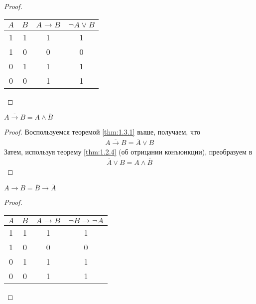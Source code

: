 \begin{proof}
	\hfill \break \break
	\begin{center}
		\begin{tabular}{ |c|c|c|c| } 
			\hline
			$A$ & $B$ & $A \rightarrow B$ & $\neg A \lor B$ \\
			\hline 
			1 & 1 & 1 & 1 \\ 
			1 & 0 & 0 & 0 \\
			0 & 1 & 1 & 1 \\ 
			0 & 0 & 1 & 1 \\  
			\hline
		\end{tabular}
	\end{center}
\end{proof}

\begin{theorem}
	$\overline{A \rightarrow B} = A \land \overline{B}$
\end{theorem}

\begin{proof}
	Воспользуемся теоремой \ref{thm:1.3.1} выше, получаем, что
	\begin{align*}
		\overline{A \rightarrow B} = \overline{A} \lor B 
	\end{align*}
	Затем, используя теорему \ref{thm:1.2.4} (об отрицании конъюнкции), преобразуем в
	\begin{align*}
		\overline{A} \lor B = A \land \overline{B}
	\end{align*} 
	
\end{proof}

\newpage

\begin{theorem}
	$A \rightarrow B = \overline{B} \rightarrow \overline{A}$
\end{theorem}

\begin{proof}
	\hfill \break \break
	\begin{center}
		\begin{tabular}{ |c|c|c|c| } 
			\hline
			$A$ & $B$ & $A \rightarrow B$ & $\neg B \rightarrow \neg A$ \\
			\hline 
			1 & 1 & 1 & 1 \\ 
			1 & 0 & 0 & 0 \\
			0 & 1 & 1 & 1 \\ 
			0 & 0 & 1 & 1 \\  
			\hline
		\end{tabular}
	\end{center}
\end{proof}

